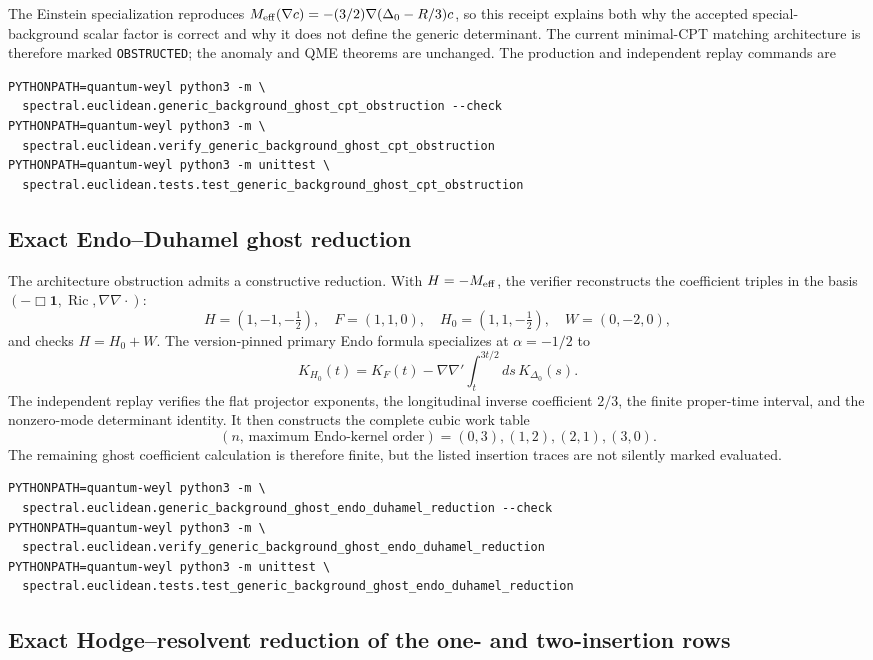 \documentclass[11pt]{article}
\theoremstyle{definition}
\theoremstyle{remark}
\begin{document}
The Einstein specialization reproduces
$M_{\rm eff}(\nabla c)=-(3/2)\nabla(\Delta_0-R/3)c$, so this receipt explains
both why the accepted special-background scalar factor is correct and why it
does not define the generic determinant.  The current minimal-CPT matching
architecture is therefore marked \texttt{OBSTRUCTED}; the anomaly and QME
theorems are unchanged.  The production and independent replay commands are
\begin{verbatim}
PYTHONPATH=quantum-weyl python3 -m \
  spectral.euclidean.generic_background_ghost_cpt_obstruction --check
PYTHONPATH=quantum-weyl python3 -m \
  spectral.euclidean.verify_generic_background_ghost_cpt_obstruction
PYTHONPATH=quantum-weyl python3 -m unittest \
  spectral.euclidean.tests.test_generic_background_ghost_cpt_obstruction
\end{verbatim}

\subsection{Exact Endo--Duhamel ghost reduction}

The architecture obstruction admits a constructive reduction.  With
$H=-M_{\rm eff}$, the verifier reconstructs the coefficient triples in the
basis $(-\Box\mathbf1,\operatorname{Ric},\nabla\nabla\!\cdot)$:
\[
 H=(1,-1,-\tfrac12),\quad
 F=(1,1,0),\quad
 H_0=(1,1,-\tfrac12),\quad
 W=(0,-2,0),
\]
and checks $H=H_0+W$.  The version-pinned primary Endo formula specializes
at $\alpha=-1/2$ to
\[
 K_{H_0}(t)=K_F(t)-\nabla\nabla'\int_t^{3t/2}ds\,K_{\Delta_0}(s).
\]
The independent replay verifies the flat projector exponents, the
longitudinal inverse coefficient $2/3$, the finite proper-time interval, and
the nonzero-mode determinant identity.  It then constructs the complete
cubic work table
\[
 (n,\,\text{maximum Endo-kernel order})=(0,3),(1,2),(2,1),(3,0).
\]
The remaining ghost coefficient calculation is therefore finite, but the
listed insertion traces are not silently marked evaluated.

\begin{verbatim}
PYTHONPATH=quantum-weyl python3 -m \
  spectral.euclidean.generic_background_ghost_endo_duhamel_reduction --check
PYTHONPATH=quantum-weyl python3 -m \
  spectral.euclidean.verify_generic_background_ghost_endo_duhamel_reduction
PYTHONPATH=quantum-weyl python3 -m unittest \
  spectral.euclidean.tests.test_generic_background_ghost_endo_duhamel_reduction
\end{verbatim}

\subsection{Exact Hodge--resolvent reduction of the one- and two-insertion rows}
\end{document}
